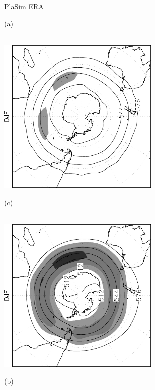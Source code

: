 \documentclass[12pt,a4paper,twoside,openright,headinclude,liststotoc,bibtotoc]{scrreprt}
\begin{document}
\begin{figure}[c]
\hspace{3.1cm}PlaSim \vspace{-0.1cm} \hspace{7.3cm} ERA \\
\parbox{8.5cm}{\hspace{0.02cm}\begin{scriptsize}(a)\end{scriptsize} \vspace{-0.3cm} \\
\includegraphics[height=7.5cm,angle=-90]
{eps/SHz500StdbpDJF.eps}
}
\parbox{8.5cm}{\hspace{0.02cm}\begin{scriptsize}(c)\end{scriptsize} \vspace{-0.3cm} \\
\includegraphics[height=7.5cm,angle=-90]
{eps/SHt21z500StdbpDJF.eps}
}
\parbox{8.5cm}{\hspace{0.02cm}\begin{scriptsize}(b)\end{scriptsize} \vspace{-0.3cm} \\
}
\end{figure}
\end{document}
